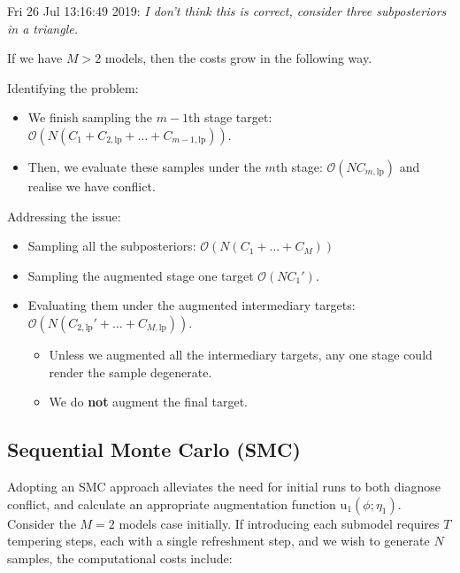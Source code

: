 \documentclass[10pt,a4paper,]{article}
\providecommand{\tightlist}{%
  \setlength{\itemsep}{0pt}\setlength{\parskip}{0pt}}
\newcommand{\tarw}{\text{u}}
\newcommand{\Nx}{N}
\newcommand{\Nm}{M}
\newcommand{\modelindex}{m}
\begin{document}
Fri 26 Jul 13:16:49 2019: \emph{I don't think this is correct, consider
three subposteriors in a triangle.}

If we have \(\Nm > 2\) models, then the costs grow in the following way.

Identifying the problem:

\begin{itemize}
\tightlist
\item
  We finish sampling the \(\modelindex-1\)th stage target:
  \(\mathcal{O}(\Nx (C_{1} + C_{2, \text{lp}} + \ldots + C_{\modelindex - 1, \text{lp}}))\).
\item
  Then, we evaluate these samples under the \(\modelindex\)th stage:
  \(\mathcal{O}(\Nx C_{\modelindex, \text{lp}})\) and realise we have
  conflict.
\end{itemize}

Addressing the issue:

\begin{itemize}
\tightlist
\item
  Sampling all the subposteriors:
  \(\mathcal{O}(\Nx (C_{1} + \ldots + C_{\Nm}))\)
\item
  Sampling the augmented stage one target \(\mathcal{O}(\Nx C_{1}')\).
\item
  Evaluating them under the augmented intermediary targets:
  \(\mathcal{O}(\Nx (C_{2, \text{lp}}' + \ldots + C_{\Nm, \text{lp}}))\).

  \begin{itemize}
  \tightlist
  \item
    Unless we augmented all the intermediary targets, any one stage
    could render the sample degenerate.
  \item
    We do \textbf{not} augment the final target.
  \end{itemize}
\end{itemize}

\subsection{Sequential Monte Carlo
(SMC)}\label{sequential-monte-carlo-smc}

Adopting an SMC approach alleviates the need for initial runs to both
diagnose conflict, and calculate an appropriate augmentation function
\(\tarw_{1}(\phi; \eta_{1})\). Consider the \(\Nm = 2\) models case
initially. If introducing each submodel requires \(T\) tempering steps,
each with a single refreshment step, and we wish to generate \(\Nx\)
samples, the computational costs include:
\end{document}
